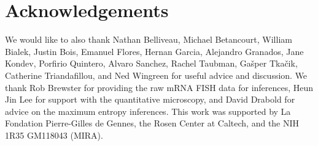 \section*{Acknowledgements}

We would like to also thank Nathan Belliveau, Michael Betancourt, William
Bialek, Justin Bois, Emanuel Flores, Hernan Garcia, Alejandro Granados, Jane
Kondev, Porfirio Quintero, Alvaro Sanchez, Rachel Taubman, Gašper Tkačik,
Catherine Triandafillou, and Ned Wingreen for useful advice and discussion. We
thank Rob Brewster for providing the raw mRNA FISH data for inferences, Heun
Jin Lee for support with the quantitative microscopy, and David Drabold for
advice on the maximum entropy inferences. This work was supported by La
Fondation Pierre-Gilles de Gennes, the Rosen Center at Caltech, and the NIH
1R35 GM118043 (MIRA).
